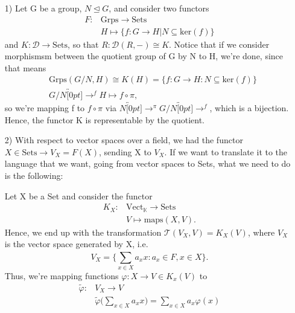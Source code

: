 \documentclass[../category_theory.tex]{subfiles}
\begin{document}
\begin{example}
	\begin{itemize}

		\item[1)]Let G be a group, \(N\trianglelefteq G\), and consider two functors
		      \begin{align*}
			      F: & \mathrm{Grps}\rightarrow \mathrm{Sets}                      \\
			         & H \mapsto \{f:G\rightarrow H | N\subseteq \mathrm{ker}(f)\}
		      \end{align*}
		      and \(K:\mathcal{D}\rightarrow \mathrm{Sets}\), so that \(R:\mathcal{D}(R, -)\cong  K\). Notice that if we consider morphismsm between the quotient group of G by N to H, we're done, since that means
		      \begin{align*}
			       & \mathrm{Grps}(G/N, H)\cong K(H)=\{f:G\rightarrow H: N\subseteq \mathrm{ker}(f)\} \\
			       & G/N\overbracket[0pt]{\longrightarrow}^{f}H\mapsto f\circ \pi ,
		      \end{align*}
		      so we're mapping f to \(f\circ \pi \) via \(N\overbracket[0pt]{\longrightarrow}^{\pi }G/N\overbracket[0pt]{\longrightarrow}^{f}\), which is a bijection. Hence, the functor K is representable by the quotient.

		\item[2)]With respect to vector spaces over a field, we had the functor \(X\in \mathrm{Sets}\rightarrow V_{X}=F(X)\), sending X to \(V_{X}\). If we want to translate it to the language that we want, going from vector spaces to Sets, what we need to do is the following:

		      Let X be a Set and consider the functor
		      \begin{align*}
			      K_{X}: & \mathrm{Vect}_{\mathbb{K}}\rightarrow \mathrm{Sets} \\
			             & V\mapsto \text{maps}(X, V).
		      \end{align*}
		      Hence, we end up with the transformation \(\mathcal{T}(V_{X}, V)=K_{X}(V)\), where \(V_{X}\) is the vector space generated by X, i.e.
		      \[
			      V_{X}=\biggl\{\sum\limits_{x\in X}^{}a_{x}x: a_x\in F, x\in X\biggr\}.
		      \]
		      Thus, we're mapping functions \(\varphi :X\rightarrow V\in K_{x}(V)\) to
		      \begin{align*}
			      \tilde\varphi : & V_{X}\rightarrow V                                                                                   \\
			                      & \tilde{\varphi }\biggl(\sum\limits_{x\in X}^{}a_{x}x\biggr) = \sum\limits_{x\in X}^{}a_{x}\varphi(x)
		      \end{align*}
	\end{itemize}
\end{example}
\end{document}
